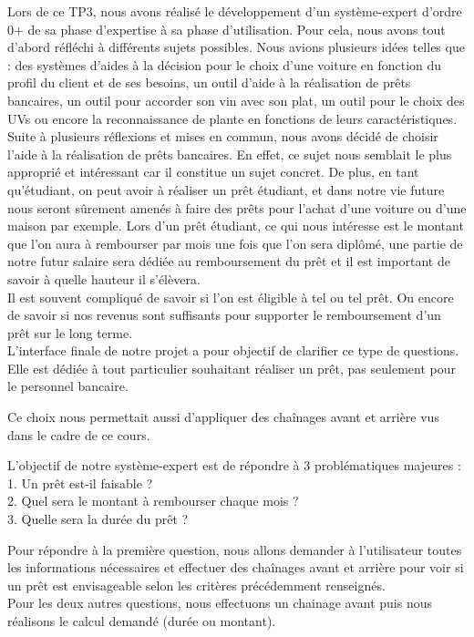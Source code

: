 \documentclass[
]{article}
\begin{document}
Lors de ce TP3, nous avons réalisé le développement d'un système-expert
d'ordre 0+ de sa phase d'expertise à sa phase d'utilisation. Pour cela,
nous avons tout d'abord réfléchi à différents sujets possibles. Nous
avions plusieurs idées telles que : des systèmes d'aides à la décision
pour le choix d'une voiture en fonction du profil du client et de ses
besoins, un outil d'aide à la réalisation de prêts bancaires, un outil
pour accorder son vin avec son plat, un outil pour le choix des UVs ou
encore la reconnaissance de plante en fonctions de leurs
caractéristiques. Suite à plusieurs réflexions et mises en commun, nous
avons décidé de choisir l'aide à la réalisation de prêts bancaires. En
effet, ce sujet nous semblait le plus approprié et intéressant car il
constitue un sujet concret. De plus, en tant qu'étudiant, on peut avoir
à réaliser un prêt étudiant, et dans notre vie future nous seront
sûrement amenés à faire des prêts pour l'achat d'une voiture ou d'une
maison par exemple. Lors d'un prêt étudiant, ce qui nous intéresse est
le montant que l'on aura à rembourser par mois une fois que l'on sera
diplômé, une partie de notre futur salaire sera dédiée au remboursement
du prêt et il est important de savoir à quelle hauteur il s'élèvera.\\
Il est souvent compliqué de savoir si l'on est éligible à tel ou tel
prêt. Ou encore de savoir si nos revenus sont suffisants pour supporter
le remboursement d'un prêt sur le long terme.\\
L'interface finale de notre projet a pour objectif de clarifier ce type
de questions. Elle est dédiée à tout particulier souhaitant réaliser un
prêt, pas seulement pour le personnel bancaire.

Ce choix nous permettait aussi d'appliquer des chaînages avant et
arrière vus dans le cadre de ce cours.

L'objectif de notre système-expert est de répondre à 3 problématiques
majeures :\\
1. Un prêt est-il faisable ?\\
2. Quel sera le montant à rembourser chaque mois ?\\
3. Quelle sera la durée du prêt ?

Pour répondre à la première question, nous allons demander à
l'utilisateur toutes les informations nécessaires et effectuer des
chaînages avant et arrière pour voir si un prêt est envisageable selon
les critères précédemment renseignés.\\
Pour les deux autres questions, nous effectuons un chainage avant
puis nous réalisons le calcul demandé (durée ou montant).
\end{document}

